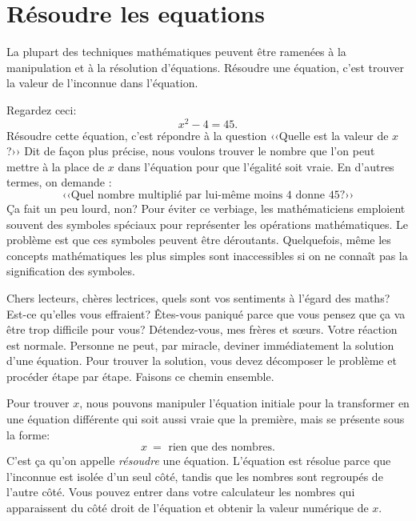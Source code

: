 
\section{Résoudre les equations}
\label{sec:solving_equations}

	La plupart des techniques mathématiques peuvent être ramenées à la manipulation et à la résolution d'équations.
	Résoudre une équation, c'est trouver la valeur de l'inconnue dans l'équation.

	Regardez ceci:
	\[
	 	x^2-4=45.
	\]
	Résoudre cette équation, c'est répondre à la question ‹‹Quelle est la valeur de $x$?››
	Dit de façon plus précise,
	nous voulons trouver le nombre que l'on peut mettre à la place de $x$ dans l'équation pour que l'égalité soit vraie. 
	En d'autres termes, on demande :
	\[
	 	\text{‹‹Quel nombre multiplié par lui-même moins 4 donne 45?››}
	\]
	Ça fait un peu lourd, non? 
	Pour éviter ce verbiage,
	les mathématiciens emploient souvent des symboles spéciaux pour représenter les opérations mathématiques.
	Le problème est que ces symboles peuvent être déroutants.
	Quelquefois, même les concepts mathématiques les plus simples sont inaccessibles si on ne connaît pas la signification des symboles.
	
	Chers lecteurs, chères lectrices, quels sont vos sentiments à l'égard des maths?
	Est-ce qu'elles vous effraient?
	Êtes-vous paniqué parce que vous pensez que ça va être trop difficile pour vous?
	Détendez-vous, mes frères et sœurs. Votre réaction est normale.
	Personne ne peut, par miracle, deviner immédiatement la solution d'une équation.
	Pour trouver la solution, vous devez décomposer le problème et procéder étape par étape.
	Faisons ce chemin ensemble.

	Pour trouver $x$,
	nous pouvons manipuler l'équation initiale pour la transformer en une équation différente qui soit aussi vraie que la première,
	mais se présente sous la forme: 
	\[ 
		x \ = \textrm{ rien que des nombres.}
	\]
	C'est ça qu'on appelle \emph{résoudre} une équation.
	L'équation est résolue parce que l'inconnue est isolée d'un seul côté,
	tandis que les nombres sont regroupés de l'autre côté.
	Vous pouvez entrer dans votre calculateur les nombres qui apparaissent du côté droit de l'équation et 
	obtenir la valeur numérique de $x$.


